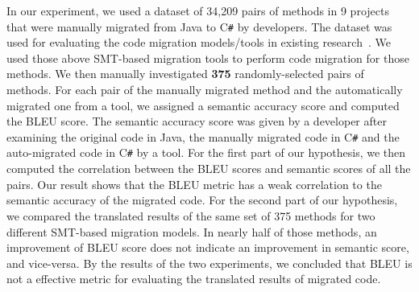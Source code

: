 %

In our experiment, we used a dataset of 34,209 pairs of methods
in 9 projects that were manually migrated from Java to
C\texttt{\#} by developers. The dataset was used for evaluating the
code migration models/tools in existing research~\cite{ase15}. We used
those above SMT-based migration tools to perform code migration for
those methods. We then manually investigated {\bf 375}
randomly-selected pairs of methods. For each pair of the manually
migrated method and the automatically migrated one from a tool, we
assigned a semantic accuracy score and computed the BLEU score. The
semantic accuracy score was given by a developer after examining the
original code in Java, the manually migrated code in C\texttt{\#} and
the auto-migrated code in C\texttt{\#} by a tool. For the first part
of our hypothesis, we then computed the correlation between the BLEU
scores and semantic scores of all the pairs. Our result shows that the
BLEU metric has a weak correlation to the semantic accuracy of the
migrated code. For the second part of our hypothesis, we compared the
translated results of the same set of 375 methods for two different
SMT-based migration models. In nearly half of those methods, an
improvement of BLEU score does not indicate an improvement in semantic
score, and vice-versa.
By the results of the two experiments, we concluded that BLEU is not a 
effective metric for evaluating the translated results of migrated code. 

